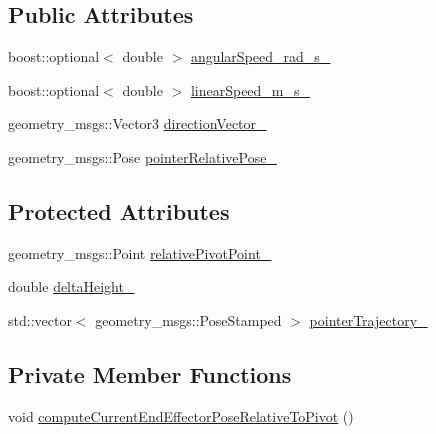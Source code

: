 \subsection*{Public Attributes}
\begin{DoxyCompactItemize}
\item 
boost\+::optional$<$ double $>$ \hyperlink{classcl__move__group__interface_1_1CbCircularPouringMotion_a7f69b3f95281fc14902117d637b59972}{angular\+Speed\+\_\+rad\+\_\+s\+\_\+}
\item 
boost\+::optional$<$ double $>$ \hyperlink{classcl__move__group__interface_1_1CbCircularPouringMotion_ac78ce543451cbb78c95862dd4273deb7}{linear\+Speed\+\_\+m\+\_\+s\+\_\+}
\item 
geometry\+\_\+msgs\+::\+Vector3 \hyperlink{classcl__move__group__interface_1_1CbCircularPouringMotion_a4c2cc7f70981981a723818039450cfe8}{direction\+Vector\+\_\+}
\item 
geometry\+\_\+msgs\+::\+Pose \hyperlink{classcl__move__group__interface_1_1CbCircularPouringMotion_a5ebef44cab4cb3dec5148232ef0eb2f8}{pointer\+Relative\+Pose\+\_\+}
\end{DoxyCompactItemize}
\subsection*{Protected Attributes}
\begin{DoxyCompactItemize}
\item 
geometry\+\_\+msgs\+::\+Point \hyperlink{classcl__move__group__interface_1_1CbCircularPouringMotion_a686d15e252dc8e503985e97014690cc6}{relative\+Pivot\+Point\+\_\+}
\item 
double \hyperlink{classcl__move__group__interface_1_1CbCircularPouringMotion_a7009d617bcd8ac1fba49100444434f3c}{delta\+Height\+\_\+}
\item 
std\+::vector$<$ geometry\+\_\+msgs\+::\+Pose\+Stamped $>$ \hyperlink{classcl__move__group__interface_1_1CbCircularPouringMotion_a6f53442c47cf9280d8be72ea1c35546f}{pointer\+Trajectory\+\_\+}
\end{DoxyCompactItemize}
\subsection*{Private Member Functions}
\begin{DoxyCompactItemize}
\item 
void \hyperlink{classcl__move__group__interface_1_1CbCircularPouringMotion_a4986b396e0ba318a0046feea3f6eede6}{compute\+Current\+End\+Effector\+Pose\+Relative\+To\+Pivot} ()
\end{DoxyCompactItemize}
